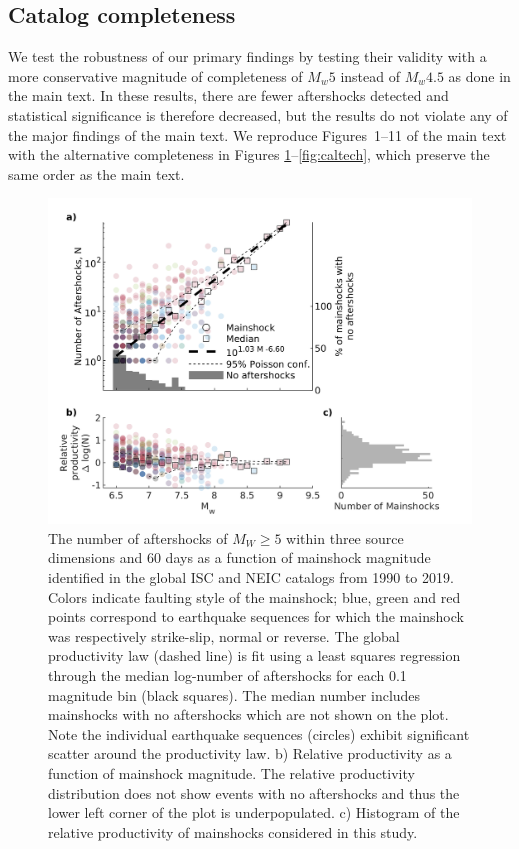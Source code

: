 \documentclass[draft]{agujournal}
\begin{document}
\subsection{Catalog completeness}\label{sec:catalog}
We test the robustness of our primary findings by testing their validity with a more conservative magnitude of completeness of $M_w5$ instead of $M_w4.5$ as done in the main text. In these results, there are fewer aftershocks detected and statistical significance is therefore decreased, but the results do not violate any of the major findings of the main text.  We reproduce Figures~1--11 of the main text with the alternative completeness in Figures \ref{fig:fms_prod}--\ref{fig:caltech}, which preserve the same order as the main text. 

\begin{figure}[H]
\centering
\includegraphics{figures/prod_law_mw5.png}
\caption{The number of aftershocks of $M_W\ge5$ within three source dimensions and 60 days as a function of mainshock magnitude identified in the global ISC and NEIC catalogs from 1990 to 2019. Colors indicate faulting style of the mainshock; blue, green and red points correspond to earthquake sequences for which the mainshock was respectively strike-slip, normal or reverse. The global productivity law (dashed line) is fit using a least squares regression through the median log-number of aftershocks for each 0.1 magnitude bin (black squares). The median number includes mainshocks with no aftershocks which are not shown on the plot. Note the individual earthquake sequences (circles) exhibit significant scatter around the productivity law. b) Relative productivity as a function of mainshock magnitude. The relative productivity distribution does not show events with no aftershocks and thus the lower left corner of the plot is underpopulated. c) Histogram of the relative productivity of mainshocks considered in this study.
}
\label{fig:fms_prod}
\end{figure}
\end{document}
